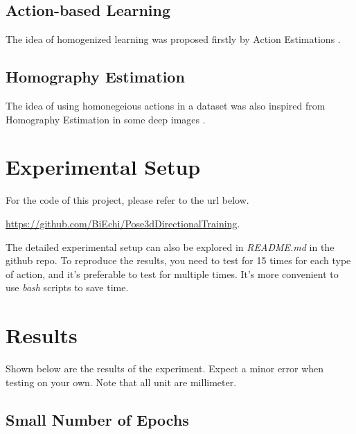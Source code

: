 \documentclass[10pt,twocolumn,letterpaper]{article}
\begin{document}
\subsection{Action-based Learning}

The idea of homogenized learning was proposed firstly by Action Estimations \cite{yao2012coupled,wang2013action}.



\subsection{Homography Estimation}

The idea of using homonegeious actions in a dataset was also inspired from Homography Estimation
in some deep images \cite{detone2016deep}. 



\section{Experimental Setup}

For the code of this project, please refer to the url below.

 \url{https://github.com/BiEchi/Pose3dDirectionalTraining}. 
 
The detailed experimental setup can also be explored in \textit{README.md} in the github repo. To reproduce
the results, you need to test for 15 times for each type of action, and it's preferable to test for multiple
times. It's more convenient to use \textit{bash} scripts to save time.


\section{Results}

Shown below are the results of the experiment. Expect a minor error when testing on your own. Note that all
unit are millimeter.

\subsection{Small Number of Epochs}
\end{document}
